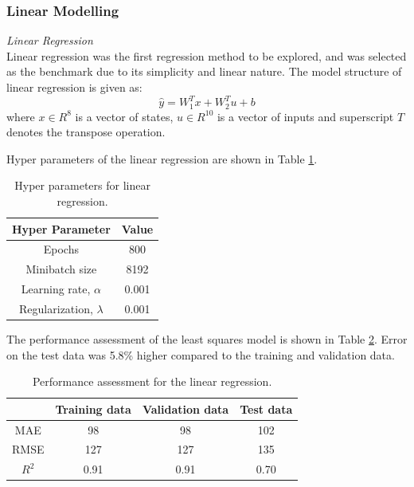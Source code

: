 %
%
\subsubsection{Linear Modelling}
\noindent
\textit{Linear Regression} \\
Linear regression was the first regression method to be explored, and was selected as the benchmark due to its simplicity and linear nature. The model structure of linear regression is given as:
\begin{equation}
    \hat{y} = W_1^Tx + W_2^Tu + b
    \label{eq:08LS}
\end{equation}
where $x \in R^8$ is a vector of states, $u \in R^{10}$ is a vector of inputs and superscript $T$ denotes the transpose operation.

Hyper parameters of the linear regression are shown in Table \ref{tab:08LSHparameters}.
\begin{table}[h]
    \centering
    {
    \begin{tabular}{ c | c}
        Hyper Parameter                  &  Value       \\
        \hline
        Epochs                           &  800      \\
        Minibatch size                   &  8192     \\
        Learning rate, $\alpha$          &  0.001    \\
        Regularization, $\lambda$          &  0.001  \\
    \end{tabular}}
    \caption{Hyper parameters for linear regression.}
    \label{tab:08LSHparameters}
\end{table}

The performance assessment of the least squares model is shown in Table \ref{tab:08LSperformance}. Error on the test data was 5.8\% higher compared to the training and validation data.
\begin{table}[h]
    \centering
    {
    \begin{tabular}{ c | c | c | c}
                             &  Training data    &  Validation data   &    Test data      \\
        \hline
        MAE                  &  98               &    98              &  102     \\
        RMSE                 &  127              &   127              &  135    \\ 
        $R^2$                &  0.91             &   0.91             &  0.70   \\
    \end{tabular}}
    \caption{Performance assessment for the linear regression.}
    \label{tab:08LSperformance}
\end{table}

